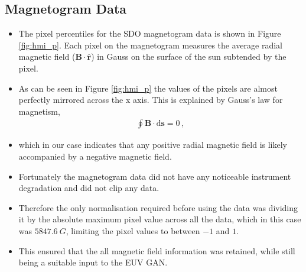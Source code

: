 \documentclass[11pt,a4paper,onecolumn]{report}
\begin{document}
\subsection{Magnetogram Data}

\begin{itemize}
  \item The pixel percentiles for the SDO magnetogram data is shown in Figure
  \ref{fig:hmi_p}. Each pixel on the magnetogram measures the average radial
  magnetic field ($\mathbf{B}\cdot\mathbf{\hat{r}}$) in Gauss on the surface of
  the sun subtended by the pixel.
  \item As can be seen in Figure \ref{fig:hmi_p} the values of the pixels are
  almost perfectly mirrored across the x axis. This is explained by Gauss's
  law for magnetism,
  \begin{align}
    \oint \mathbf{B} \cdot \text{d}\mathbf{s} = 0 \,,
  \end{align}
  \item which in our case indicates that any positive radial magnetic field is
  likely accompanied by a negative magnetic field.
  \item Fortunately the magnetogram data did not have any noticeable instrument
  degradation and did not clip any data.
  \item Therefore the only normalisation required before using the data was
  dividing it by the absolute maximum pixel value across all the data, which in
  this case was $\SI[]{5847.6}[]{G}$, limiting the pixel values to between $-1$
  and $1$. 
  \item This ensured that the all magnetic field information was retained, while
  still being a suitable input to the EUV GAN.
\end{itemize}
\end{document}
